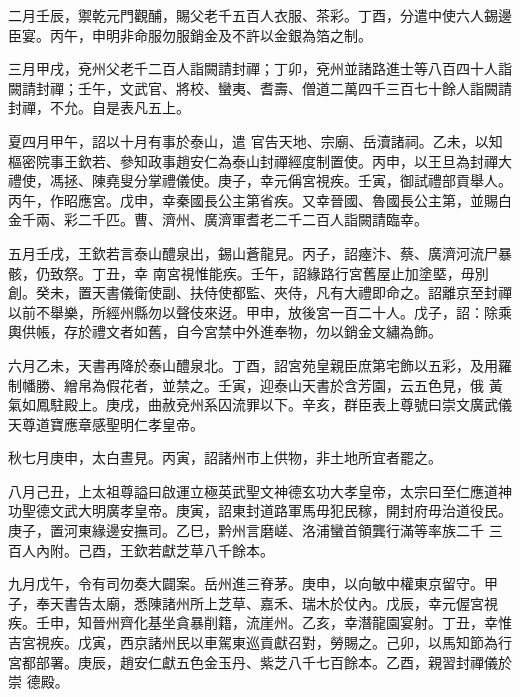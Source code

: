 \begin{pinyinscope}
 二月壬辰，禦乾元門觀酺，賜父老千五百人衣服、茶彩。丁酉，分遣中使六人錫邊臣宴。丙午，申明非命服勿服銷金及不許以金銀為箔之制。



 三月甲戌，兗州父老千二百人詣闕請封禪；丁卯，兗州並諸路進士等八百四十人詣闕請封禪；壬午，文武官、將校、蠻夷、耆壽、僧道二萬四千三百七十餘人詣闕請封禪，不允。自是表凡五上。



 夏四月甲午，詔以十月有事於泰山，遣
 官告天地、宗廟、岳瀆諸祠。乙未，以知樞密院事王欽若、參知政事趙安仁為泰山封禪經度制置使。丙申，以王旦為封禪大禮使，馮拯、陳堯叟分掌禮儀使。庚子，幸元偁宮視疾。壬寅，御試禮部貢舉人。丙午，作昭應宮。戊申，幸秦國長公主第省疾。又幸晉國、魯國長公主第，並賜白金千兩、彩二千匹。曹、濟州、廣濟軍耆老二千二百人詣闕請臨幸。



 五月壬戌，王欽若言泰山醴泉出，錫山蒼龍見。丙子，詔瘞汴、蔡、廣濟河流尸暴骸，仍致祭。丁丑，幸
 南宮視惟能疾。壬午，詔緣路行宮舊屋止加塗塈，毋別創。癸未，置天書儀衛使副、扶侍使都監、夾侍，凡有大禮即命之。詔離京至封禪以前不舉樂，所經州縣勿以聲伎來迓。甲申，放後宮一百二十人。戊子，詔：除乘輿供帳，存於禮文者如舊，自今宮禁中外進奉物，勿以銷金文繡為飾。



 六月乙未，天書再降於泰山醴泉北。丁酉，詔宮苑皇親臣庶第宅飾以五彩，及用羅制幡勝、繒帛為假花者，並禁之。壬寅，迎泰山天書於含芳園，云五色見，俄
 黃氣如鳳駐殿上。庚戌，曲赦兗州系囚流罪以下。辛亥，群臣表上尊號曰崇文廣武儀天尊道寶應章感聖明仁孝皇帝。



 秋七月庚申，太白晝見。丙寅，詔諸州市上供物，非土地所宜者罷之。



 八月己丑，上太祖尊謚曰啟運立極英武聖文神德玄功大孝皇帝，太宗曰至仁應道神功聖德文武大明廣孝皇帝。庚寅，詔東封道路軍馬毋犯民稼，開封府毋治道役民。庚子，置河東緣邊安撫司。乙巳，黔州言磨嵯、洛浦蠻首領龔行滿等率族二千
 三百人內附。己酉，王欽若獻芝草八千餘本。



 九月戊午，令有司勿奏大闢案。岳州進三脊茅。庚申，以向敏中權東京留守。甲子，奉天書告太廟，悉陳諸州所上芝草、嘉禾、瑞木於仗內。戊辰，幸元偓宮視疾。壬申，知晉州齊化基坐貪暴削籍，流崖州。乙亥，幸潛龍園宴射。丁丑，幸惟吉宮視疾。戊寅，西京諸州民以車駕東巡貢獻召對，勞賜之。己卯，以馬知節為行宮都部署。庚辰，趙安仁獻五色金玉丹、紫芝八千七百餘本。乙酉，親習封禪儀於崇
 德殿。




\end{pinyinscope}
